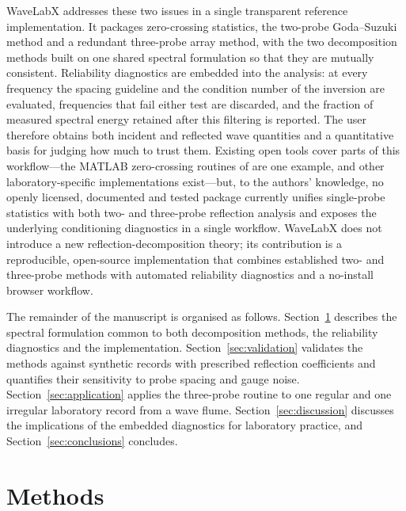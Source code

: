 \documentclass[preprint,12pt,a4paper]{elsarticle}
\begin{document}
WaveLabX addresses these two issues in a single transparent reference
implementation. It packages zero-crossing statistics, the two-probe
Goda--Suzuki method and a redundant three-probe array method, with the
two decomposition methods built on one shared spectral formulation so
that they are mutually consistent. Reliability diagnostics are embedded
into the analysis: at every frequency the spacing guideline and the
condition number of the inversion are evaluated, frequencies that fail
either test are discarded, and the fraction of measured spectral energy
retained after this filtering is reported. The user therefore obtains
both incident and reflected wave quantities and a quantitative basis
for judging how much to trust them. Existing open tools cover parts of
this workflow---the MATLAB zero-crossing routines of
\citet{neumeier_waveanalysis} are one example, and other
laboratory-specific implementations exist---but, to the authors'
knowledge, no openly licensed, documented and tested package currently
unifies single-probe statistics with both two- and three-probe
reflection analysis and exposes the underlying conditioning
diagnostics in a single workflow. WaveLabX does not introduce a new
reflection-decomposition theory; its contribution is a reproducible,
open-source implementation that combines established two- and
three-probe methods with automated reliability diagnostics and a
no-install browser workflow.

The remainder of the manuscript is organised as follows.
Section~\ref{sec:methods} describes the spectral formulation common to
both decomposition methods, the reliability diagnostics and the
implementation. Section~\ref{sec:validation} validates the methods
against synthetic records with prescribed reflection coefficients and
quantifies their sensitivity to probe spacing and gauge noise.
Section~\ref{sec:application} applies the three-probe routine to one
regular and one irregular laboratory record from a wave flume.
Section~\ref{sec:discussion} discusses the implications of the
embedded diagnostics for laboratory practice, and
Section~\ref{sec:conclusions} concludes.

\section{Methods}
\label{sec:methods}
\end{document}
